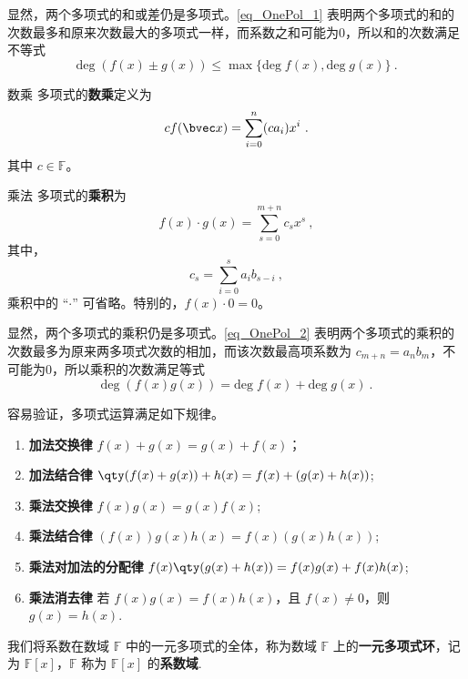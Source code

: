 显然，两个多项式的和或差仍是多项式。\autoref{eq_OnePol_1} 表明两个多项式的和的次数最多和原来次数最大的多项式一样，而系数之和可能为0，所以和的次数满足不等式
\begin{equation}\label{eq_OnePol_3}
\mathrm{deg}\;(f(x)\pm g(x))\leq \max\{\mathrm{deg}\;f(x),\mathrm{deg}\;g(x)\}~.
\end{equation}
\begin{definition}{数乘}
多项式的\textbf{数乘}定义为
\begin{equation}
cf(\bvec x)=\sum_{i=0}^n (ca_i)x^i~.
\end{equation}
其中 $c\in\mathbb F$。
\end{definition}

\begin{definition}{乘法}
多项式的\textbf{乘积}为
\begin{equation}
f(x)\cdot g(x)=\sum_{s=0}^{m+n} c_s x^s
\label{eq_OnePol_2}~,
\end{equation}
其中，
\begin{equation}
c_s=\sum_{i=0}^s a_i b_{s-i}~,
\end{equation}
乘积中的 “$\cdot$” 可省略。特别的，$f(x)\cdot 0=0$。
\end{definition}

显然，两个多项式的乘积仍是多项式。\autoref{eq_OnePol_2} 表明两个多项式的乘积的次数最多为原来两多项式次数的相加，而该次数最高项系数为 $c_{m+n}=a_n b_m$，不可能为0，所以乘积的次数满足等式
\begin{equation}\label{eq_OnePol_4}
\mathrm{deg}\;(f(x)g(x))= \mathrm{deg}\;f(x)+\mathrm{deg}\;g(x)~.
\end{equation}

容易验证，多项式运算满足如下规律。
\begin{enumerate}
\item \textbf{加法交换律} $f(x)+g(x)=g(x)+f(x)$；
\item \textbf{加法结合律} $\qty(f(x)+g(x))+h(x)=f(x)+(g(x)+h(x))$;
\item \textbf{乘法交换律} $f(x)g(x)=g(x)f(x)$;
\item \textbf{乘法结合律} $(f(x))g(x)h(x)=f(x)(g(x)h(x))$;
\item \textbf{乘法对加法的分配律} $f(x)\qty(g(x)+h(x))=f(x)g(x)+f(x)h(x)$;
\item \textbf{乘法消去律} 若 $f(x)g(x)=f(x)h(x)$，且 $f(x)\neq0$，则 $g(x)=h(x)$.
\end{enumerate}
我们将系数在数域 $\mathbb{F}$ 中的一元多项式的全体，称为数域 $\mathbb{F}$ 上的\textbf{一元多项式环}，记为 $\mathbb{F}[x]$，$\mathbb{F}$ 称为 $\mathbb{F}[x]$ 的\textbf{系数域}.


